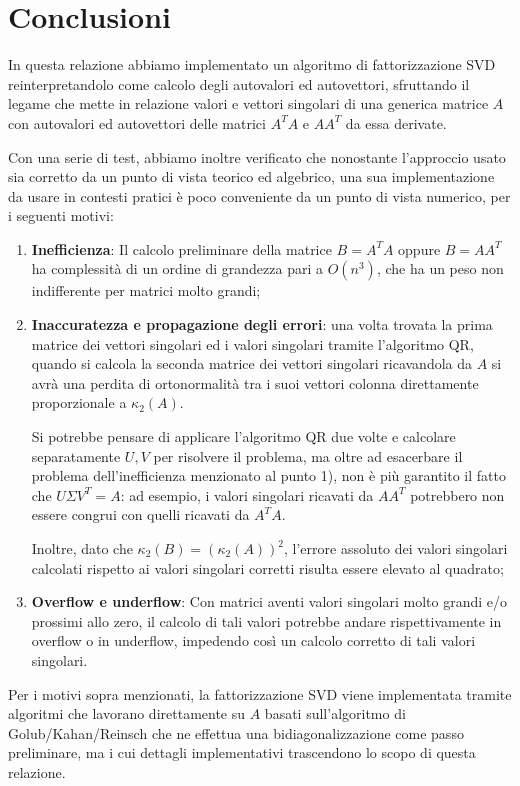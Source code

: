 \chapter{Conclusioni}
In questa relazione abbiamo implementato un algoritmo di fattorizzazione 
SVD reinterpretandolo come calcolo degli autovalori ed autovettori, sfruttando 
il legame che mette in relazione valori e vettori singolari di una generica 
matrice $A$ con autovalori ed autovettori delle matrici $A^T A$ e $A A^T$ da 
essa derivate.

Con una serie di test, abbiamo inoltre verificato che nonostante l'approccio 
usato sia corretto da un punto di vista teorico ed algebrico, una sua 
implementazione da usare in contesti pratici è poco conveniente da un punto di 
vista numerico, per i seguenti motivi:
\begin{enumerate}
	\item \textbf{Inefficienza}: Il calcolo preliminare della matrice $B = A^T A$ 
oppure $B = A A^T$ ha complessità di un ordine di grandezza pari a $O(n^3)$, che 
ha un peso non indifferente per matrici molto grandi;
	
	\item \textbf{Inaccuratezza e propagazione degli errori}: una volta trovata la 
prima matrice dei vettori singolari ed i valori singolari tramite l'algoritmo 
QR, quando si calcola la seconda matrice dei vettori singolari ricavandola da 
$A$ si avrà una perdita di ortonormalità tra i suoi vettori colonna direttamente 
proporzionale a $\kappa_2(A)$.
	
	Si potrebbe pensare di applicare l'algoritmo QR due volte e calcolare 
separatamente $U,V$ per risolvere il problema, ma oltre ad esacerbare il 
problema dell'inefficienza menzionato al punto 1), non è più garantito il fatto 
che $U \Sigma V^T = A$: ad esempio, i valori singolari ricavati da $A A^T$ 
potrebbero non essere congrui con quelli ricavati da $A^T A$.
	
	Inoltre, dato che $\kappa_2(B) = (\kappa_2(A))^2$, l'errore assoluto dei valori 
singolari calcolati rispetto ai valori singolari corretti risulta essere elevato 
al quadrato;
	
	\item \textbf{Overflow e underflow}: Con matrici aventi valori singolari molto 
grandi e/o prossimi allo zero, il calcolo di tali valori potrebbe andare 
rispettivamente in overflow o in underflow, impedendo così un calcolo corretto 
di tali valori singolari.
\end{enumerate}

Per i motivi sopra menzionati, la fattorizzazione SVD viene implementata tramite 
algoritmi che lavorano direttamente su $A$ basati sull'algoritmo di 
Golub/Kahan/Reinsch che ne effettua una bidiagonalizzazione come passo 
preliminare, ma i cui dettagli implementativi trascendono lo scopo di questa 
relazione.

